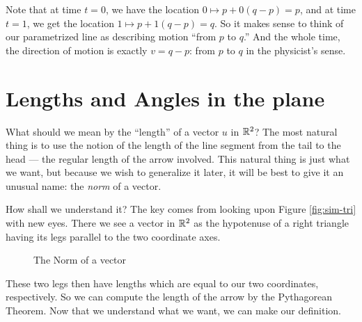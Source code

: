 \documentclass[00-livre-main.tex]{subfiles}
\begin{document}
Note that at time $t=0$, we have the location $0 \mapsto p + 0(q-p) = p$, and at time $t=1$, we get the location $1 \mapsto p+1(q-p) = q$. So it makes sense to think of our parametrized line as describing motion ``from $p$ to $q$.'' And the whole time, the direction of motion is exactly $v=q-p$: from $p$ to $q$ in the physicist's sense.


\section*{Lengths and Angles in the plane}

What should we mean by the ``length'' of a vector $u$ in $\mathbb{R}^2$? The most natural thing is to use the notion of the length of the line segment from the tail to the head --- the regular length of the arrow involved. This natural thing is just what we want, but because we wish to generalize it later, it will be best to give it an unusual name: the \emph{norm} of a vector. 

How shall we understand it? The key comes from looking upon Figure \ref{fig:sim-tri}
with new eyes. There we see a vector in $\mathbb{R}^2$ as the hypotenuse of a right triangle 
having its legs parallel to the two coordinate axes.

\begin{figure}[h!]
\centering
{}
\caption{The Norm of a vector}
\label{fig:norm}
\end{figure}

These two legs then have lengths which are equal to our two coordinates, respectively.
So we can compute the length of the arrow by the Pythagorean Theorem. Now that we understand what we want, we can make our definition.
\end{document}
